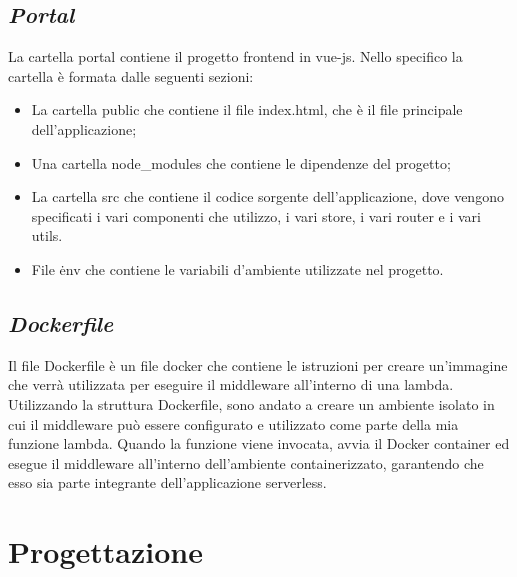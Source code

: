 \subsection*{\emph{Portal}}
La cartella portal contiene il progetto frontend in vue-js. Nello specifico la cartella è formata dalle seguenti sezioni:
\begin{itemize}
  \item La cartella public che contiene il file index.html, che è il file principale dell'applicazione;
  \item Una cartella node\_modules che contiene le dipendenze del progetto;
  \item La cartella src che contiene il codice sorgente dell'applicazione, dove vengono specificati i vari componenti che utilizzo, i vari store, i vari router e i vari utils.
  \item File \.env che contiene le variabili d'ambiente utilizzate nel progetto.
\end{itemize}

\subsection*{\emph{Dockerfile}}
Il file Dockerfile è un file docker che contiene le istruzioni per creare un'immagine che verrà utilizzata per eseguire il middleware all'interno di una lambda.\\
Utilizzando la struttura Dockerfile, sono andato a creare un ambiente isolato in cui il middleware può essere configurato e utilizzato come parte della mia funzione 
lambda. Quando la funzione viene invocata, avvia il Docker container ed esegue il middleware all'interno dell'ambiente containerizzato, 
garantendo che esso sia parte integrante dell'applicazione serverless.











\section{Progettazione}
\label{sec:progettazione}

